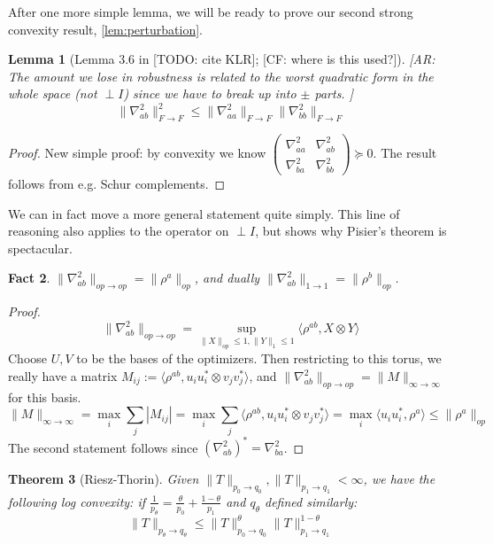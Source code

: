 \documentclass{article}
\newtheorem{theorem}{Theorem}
\newtheorem{lemma}[theorem]{Lemma}
\newtheorem{fact}[theorem]{Fact}
\newcommand{\CF}[1]{{\color{purple}[CF: #1]}}
\newcommand{\AR}[1]{{\color{orange}[AR: #1]}}
\newcommand{\TODO}[1]{{\color{blue}[TODO: #1]}}
\begin{document}
After one more simple lemma, we will be ready to prove our second strong convexity result, \cref{lem:perturbation}.
\begin{lemma} [Lemma 3.6 in \TODO{cite KLR}; \CF{where is this used?}]
\AR{The amount we lose in robustness is related to the worst quadratic form in the whole space (not $\perp I$) since we have to break up into $\pm$ parts. }
\[ \|\nabla_{ab}^{2}\|_{F \to F}^{2} \leq \|\nabla_{aa}^{2}\|_{F \to F} \|\nabla_{bb}^{2}\|_{F \to F}   \]
\end{lemma}
\begin{proof}
New simple proof: by convexity we know $\begin{pmatrix} \nabla_{aa}^{2} & \nabla_{ab}^{2} \\ \nabla_{ba}^{2} & \nabla_{bb}^{2}  \end{pmatrix} \succeq 0$. The result follows from e.g. Schur complements. 
\end{proof}

We can in fact move a more general statement quite simply. This line of reasoning also applies to the operator on $\perp I$, but shows why Pisier's theorem is spectacular. 

\begin{fact}
$\|\nabla_{ab}^{2}\|_{op \to op} = \|\rho^{a}\|_{op}$, and dually $\|\nabla_{ab}^{2}\|_{1 \to 1} = \|\rho^{b}\|_{op}$. 
\end{fact}
\begin{proof}
\[ \|\nabla_{ab}^{2}\|_{op \to op} = \sup_{\|X\|_{op} \leq 1, \|Y\|_{1} \leq 1} \langle \rho^{ab}, X \otimes Y \rangle  \]
Choose $U,V$ to be the bases of the optimizers. Then restricting to this torus, we really have a matrix $M_{ij} := \langle \rho^{ab}, u_{i} u_{i}^{*} \otimes v_{j} v_{j}^{*} \rangle$, and $\|\nabla_{ab}^{2}\|_{op \to op} = \|M\|_{\infty \to \infty}$ for this basis. 
\[ \|M\|_{\infty \to \infty} = \max_{i} \sum_{j} |M_{ij}| = \max_{i} \sum_{j} \langle \rho^{ab}, u_{i} u_{i}^{*} \otimes v_{j} v_{j}^{*} \rangle = \max_{i} \langle u_{i} u_{i}^{*}, \rho^{a} \rangle \leq \|\rho^{a}\|_{op}   \]
The second statement follows since $(\nabla_{ab}^{2})^{*} = \nabla_{ba}^{2}$. 
\end{proof}

\begin{theorem} [Riesz-Thorin]
Given $\|T\|_{p_{0} \to q_{0}}, \|T\|_{p_{1} \to q_{1}} < \infty$, we have the following log convexity: if $\frac{1}{p_{\theta}} = \frac{\theta}{p_{0}} + \frac{1-\theta}{p_{1}}$ and $q_{\theta}$ defined similarly:
\[ \|T\|_{p_{\theta} \to q_{\theta}} \leq \|T\|_{p_{0} \to q_{0}}^{\theta} \|T\|_{p_{1} \to q_{1}}^{1-\theta}    \]
\end{theorem}
\end{document}

